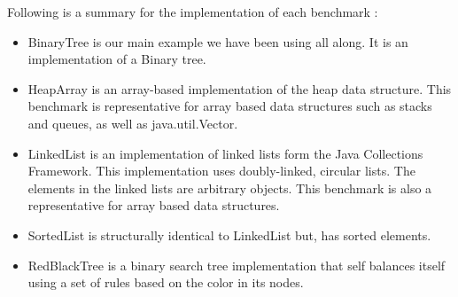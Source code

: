 \begin{table}[h]
\caption{Benchmarks and finitization parameters. Each benchmark is
  named after the class for which data structures are generated; the
  structures also contain objects from other classes.}
\label{fig:benchmarksAndFinitizationParams}
\end{table}

\para
Following is a summary for the implementation of each benchmark : 
\begin{itemize}
\item BinaryTree is our main example we have been using all along. It is an implementation of a Binary tree.
\item HeapArray is an array-based implementation of the heap data structure. This benchmark is representative for array based data structures such as stacks and queues, as well as java.util.Vector.
\item LinkedList is an implementation of linked lists form the Java Collections Framework. This implementation uses doubly-linked, circular lists. The elements in the linked lists are arbitrary objects. This benchmark is also a representative for array based data structures.
\item SortedList is structurally identical to LinkedList but, has sorted elements.
\item RedBlackTree is a binary search tree implementation that self balances itself using a set of rules based on the color in its nodes.
\end{itemize}


